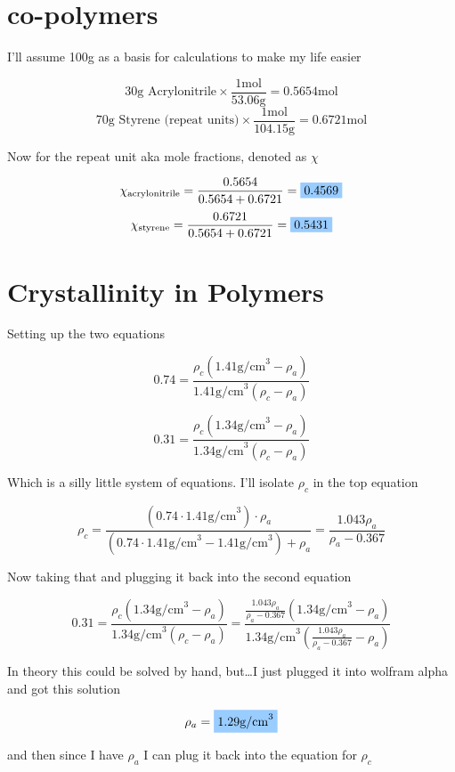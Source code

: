 \documentclass{article}
\newcommand\answer[1]{\colorbox{CornflowerBlue}{$#1$}}
\begin{document}
\section{co-polymers}
\indent

I'll assume 100g as a basis for calculations to make my life easier

\[ 30\text{g Acrylonitrile} \times \frac{1 \text{mol}}{53.06 \text{g}} = 0.5654 \text{mol} \]
\[ 70\text{g Styrene (repeat units)} \times \frac{1 \text{mol}}{104.15 \text{g}} = 0.6721 \text{mol} \]

Now for the repeat unit aka mole fractions, denoted as $\chi$

\[ \chi_{\text{acrylonitrile}} = \frac{0.5654}{0.5654 + 0.6721} = \answer{0.4569} \]
\[ \chi_{\text{styrene}} = \frac{0.6721}{0.5654 + 0.6721} = \answer{0.5431} \]

\section{Crystallinity in Polymers}
\indent

Setting up the two equations

\[ 0.74 = \frac{\rho_c \left( 1.41 \text{g/cm}^3 - \rho_a \right)}{1.41 \text{g/cm}^3 \left( \rho_c - \rho_a \right)} \]

\[ 0.31 = \frac{\rho_c \left( 1.34 \text{g/cm}^3 - \rho_a \right)}{1.34 \text{g/cm}^3 \left( \rho_c - \rho_a \right)} \]

Which is a silly little system of equations. I'll isolate $\rho_c$ in the top equation

\[ \rho_c = \frac{\left(0.74 \cdot 1.41 \text{g/cm}^3\right) \cdot \rho_a}{\left(0.74 \cdot 1.41 \text{g/cm}^3 - 1.41 \text{g/cm}^3\right) + \rho_a} = \frac{1.043 \rho_a}{\rho_a - 0.367} \]

Now taking that and plugging it back into the second equation

\[ 0.31 = \frac{\rho_c \left( 1.34 \text{g/cm}^3 - \rho_a \right)}{1.34 \text{g/cm}^3 \left( \rho_c - \rho_a \right)} = \frac{\frac{1.043 \rho_a}{\rho_a - 0.367} \left( 1.34 \text{g/cm}^3 - \rho_a \right)}{1.34 \text{g/cm}^3 \left( \frac{1.043 \rho_a}{\rho_a - 0.367} - \rho_a \right)} \]

In theory this could be solved by hand, but\dots I just plugged it into wolfram alpha and got this solution

\[ \rho_a = \answer{1.29 \text{g/cm}^3} \]

and then since I have $\rho_a$ I can plug it back into the equation for $\rho_c$
\end{document}
